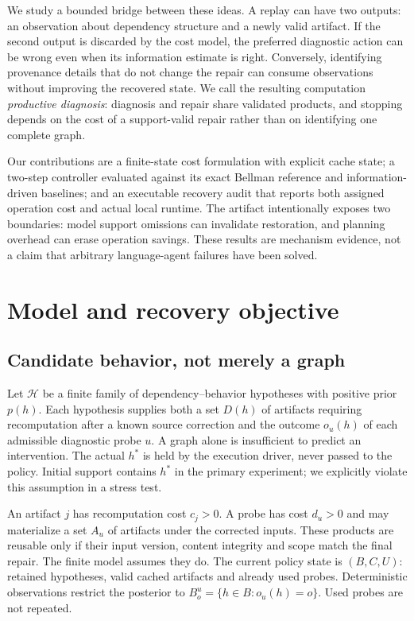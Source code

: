 \documentclass[10pt,letterpaper]{article}
\begin{document}
We study a bounded bridge between these ideas. A replay can have two outputs: an observation about dependency structure and a newly valid artifact. If the second output is discarded by the cost model, the preferred diagnostic action can be wrong even when its information estimate is right. Conversely, identifying provenance details that do not change the repair can consume observations without improving the recovered state. We call the resulting computation \emph{productive diagnosis}: diagnosis and repair share validated products, and stopping depends on the cost of a support-valid repair rather than on identifying one complete graph.

Our contributions are a finite-state cost formulation with explicit cache state; a two-step controller evaluated against its exact Bellman reference and information-driven baselines; and an executable recovery audit that reports both assigned operation cost and actual local runtime. The artifact intentionally exposes two boundaries: model support omissions can invalidate restoration, and planning overhead can erase operation savings. These results are mechanism evidence, not a claim that arbitrary language-agent failures have been solved.

\section{Model and recovery objective}
\subsection{Candidate behavior, not merely a graph}
Let $\mathcal H$ be a finite family of dependency--behavior hypotheses with positive prior $p(h)$. Each hypothesis supplies both a set $D(h)$ of artifacts requiring recomputation after a known source correction and the outcome $o_u(h)$ of each admissible diagnostic probe $u$. A graph alone is insufficient to predict an intervention. The actual $h^*$ is held by the execution driver, never passed to the policy. Initial support contains $h^*$ in the primary experiment; we explicitly violate this assumption in a stress test.

An artifact $j$ has recomputation cost $c_j>0$. A probe has cost $d_u>0$ and may materialize a set $A_u$ of artifacts under the corrected inputs. These products are reusable only if their input version, content integrity and scope match the final repair. The finite model assumes they do. The current policy state is $(B,C,U)$: retained hypotheses, valid cached artifacts and already used probes. Deterministic observations restrict the posterior to $B_o^u=\{h\in B:o_u(h)=o\}$. Used probes are not repeated.
\end{document}
